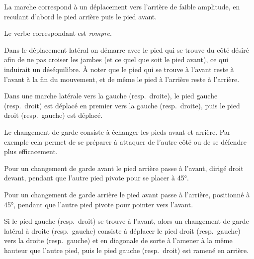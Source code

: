\begin{definition}[Retraite]

La marche correspond à un déplacement vers l'arrière de faible amplitude, en reculant d'abord le pied arrière puis le pied avant.

Le verbe correspondant est \emph{rompre}.
\end{definition}


Dans le déplacement latéral on démarre avec le pied qui se trouve du côté désiré afin de ne pas croiser les jambes (et ce quel que soit le pied avant), ce qui induirait un déséquilibre.
À noter que le pied qui se trouve à l'avant reste à l'avant à la fin du mouvement, et de même le pied à l'arrière reste à l'arrière.

\begin{definition}

Dans une marche latérale vers la gauche (resp.\ droite), le pied gauche (resp.\ droit) est déplacé en premier vers la gauche (resp.\ droite), puis le pied droit (resp.\ gauche) est déplacé.
\end{definition}


Le changement de garde consiste à échanger les pieds avant et arrière.
Par exemple cela permet de se préparer à attaquer de l'autre côté ou de se défendre plus efficacement.


\begin{definition}

Pour un changement de garde avant le pied arrière passe à l'avant, dirigé droit devant, pendant que l'autre pied pivote pour se placer à 45°.
\end{definition}


\begin{definition}

Pour un changement de garde arrière le pied avant passe à l'arrière, positionné à 45°, pendant que l'autre pied pivote pour pointer vers l'avant.
\end{definition}


\begin{definition}

Si le pied gauche (resp.\ droit) se trouve à l'avant, alors un changement de garde latéral à droite (resp.\ gauche) consiste à déplacer le pied droit (resp.\ gauche) vers la droite (resp.\ gauche) et en diagonale de sorte à l'amener à la même hauteur que l'autre pied, puis le pied gauche (resp.\ droit) est ramené en arrière.
\end{definition}


